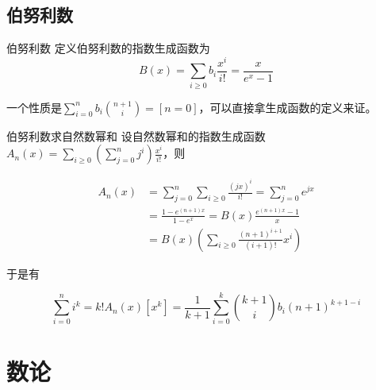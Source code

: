 \documentclass{beamer}
\begin{document}
	\subsection{伯努利数}
	\begin{frame}{伯努利数}
		定义伯努利数的指数生成函数为$$B(x)=\sum_{i \ge 0}b_i\frac{x^i}{i!}=\frac{x}{e^x-1}$$
		
		一个性质是$\sum_{i=0}^nb_i\binom{n+1}{i}=[n=0]$，可以直接拿生成函数的定义来证。
	\end{frame}
	\begin{frame}{伯努利数求自然数幂和}
		设自然数幂和的指数生成函数$A_n(x)=\sum_{i\ge0}(\sum_{j=0}^nj^i)\frac{x^i}{i!}$，则
		
		$$
		\begin{aligned}
		A_n(x)&=\sum_{j=0}^n\sum_{i\ge0}\frac{(jx)^i}{i!}=\sum_{j=0}^ne^{jx}\\
		&=\frac{1-e^{(n+1)x}}{1-e^x}=B(x)\frac{e^{(n+1)x}-1}{x}\\
		&=B(x)(\sum_{i\ge0}\frac{(n+1)^{i+1}}{(i+1)!}x^i)
		\end{aligned}
		$$
		
		于是有
		
		$$\sum_{i=0}^ni^k=k!A_n(x)[x^k]=\frac{1}{k+1}\sum_{i=0}^k\binom{k+1}{i}b_i(n+1)^{k+1-i}$$
	\end{frame}
	\section{数论}
\end{document}

